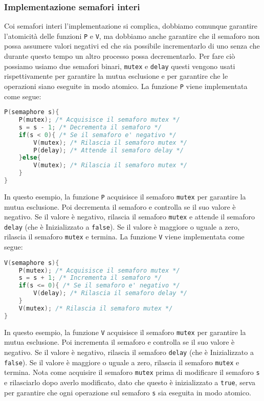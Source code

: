     \subsubsection{Implementazione semafori interi}
        Coi semafori interi l'implementazione si complica, dobbiamo comunque garantire l'atomicità delle funzioni \texttt{P} e \texttt{V}, ma dobbiamo anche garantire che il semaforo non possa assumere valori negativi ed che sia possibile incrementarlo di uno senza che durante questo tempo un altro processo possa decrementarlo. Per fare ciò possiamo usiamo due semafori binari, \texttt{mutex} e \texttt{delay} questi vengono usati rispettivamente per garantire la mutua esclusione e per garantire che le operazioni siano eseguite in modo atomico. La funzione \texttt{P} viene implementata come segue:
        \begin{lstlisting}[language=C++,basicstyle=\footnotesize]
P(semaphore s){
    P(mutex); /* Acquisisce il semaforo mutex */
    s = s - 1; /* Decrementa il semaforo */
    if(s < 0){ /* Se il semaforo e' negativo */
        V(mutex); /* Rilascia il semaforo mutex */
        P(delay); /* Attende il semaforo delay */
    }else{
        V(mutex); /* Rilascia il semaforo mutex */
    }
}
        \end{lstlisting}
        In questo esempio, la funzione \texttt{P} acquisisce il semaforo \texttt{mutex} per garantire la mutua esclusione. Poi decrementa il semaforo e controlla se il suo valore è negativo. Se il valore è negativo, rilascia il semaforo \texttt{mutex} e attende il semaforo \texttt{delay} (che è Inizializzato a \texttt{false}). Se il valore è maggiore o uguale a zero, rilascia il semaforo \texttt{mutex} e termina. La funzione \texttt{V} viene implementata come segue:
        \begin{lstlisting}[language=C++,basicstyle=\footnotesize]
V(semaphore s){
    P(mutex); /* Acquisisce il semaforo mutex */
    s = s + 1; /* Incrementa il semaforo */
    if(s <= 0){ /* Se il semaforo e' negativo */
        V(delay); /* Rilascia il semaforo delay */
    }
    V(mutex); /* Rilascia il semaforo mutex */
}
        \end{lstlisting}
        In questo esempio, la funzione \texttt{V} acquisisce il semaforo \texttt{mutex} per garantire la mutua esclusione. Poi incrementa il semaforo e controlla se il suo valore è negativo. Se il valore è negativo, rilascia il semaforo \texttt{delay} (che è Inizializzato a \texttt{false}). Se il valore è maggiore o uguale a zero, rilascia il semaforo \texttt{mutex} e termina. Nota come acquisire il semaforo \texttt{mutex} prima di modificare il semaforo \texttt{s} e rilasciarlo dopo averlo modificato, dato che questo è inizializzato a \texttt{true}, serva per garantire che ogni operazione sul semaforo \texttt{s} sia eseguita in modo atomico. \newline
